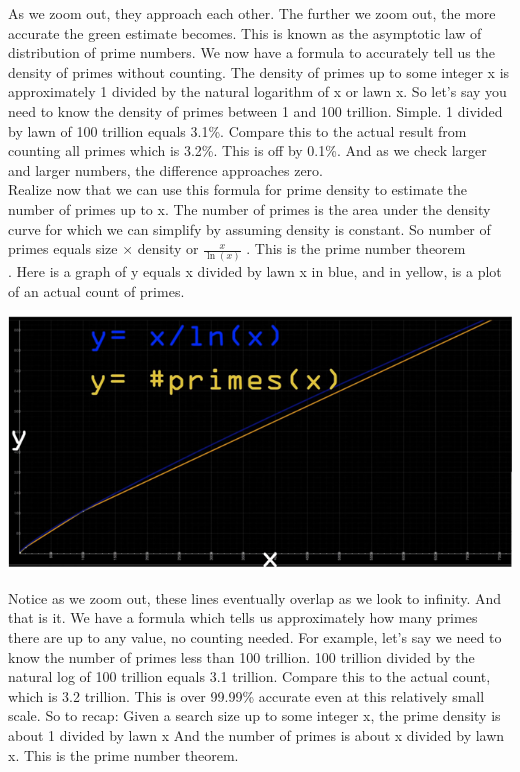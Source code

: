 \documentclass{report}
\begin{document}
As we zoom out, they approach each other. The further we zoom out, the more accurate the green estimate becomes. This is known as the asymptotic law of distribution of prime numbers. We now have a formula to accurately tell us the density of primes without counting. The density of primes up to some integer x is approximately 1 divided by the natural logarithm of x or lawn x. So let's say you need to know the density of primes between 1 and 100 trillion. Simple. 1 divided by lawn of 100 trillion equals 3.1\%. Compare this to the actual result from counting all primes which is 3.2\%. This is off by 0.1\%. And as we check larger and larger numbers, the difference approaches zero.\\
Realize now that we can use this formula for prime density to estimate the number of primes up to x. The number of primes is the area under the density curve for which we can simplify by assuming density is constant. So number of primes equals size × density or $\frac{x}{\ln(x)}$    . This is the prime number theorem\\. 
Here is a graph of y equals x divided by lawn x in blue, and in yellow, is a plot of an actual count of primes.
\begin{center}
	\includegraphics[scale=1]{65.png}
\end{center}
 Notice as we zoom out, these lines eventually overlap as we look to infinity. And that is it. We have a formula which tells us approximately how many primes there are up to any value, no counting needed. For example, let's say we need to know the number of primes less than 100 trillion. 100 trillion divided by the natural log of 100 trillion equals 3.1 trillion. Compare this to the actual count, which is 3.2 trillion. This is over 99.99\% accurate even at this relatively small scale.
So to recap: Given a search size up to some integer x, the prime density is about 1 divided by lawn x And the number of primes is about x divided by lawn x. This is the prime number theorem.
\end{document}
